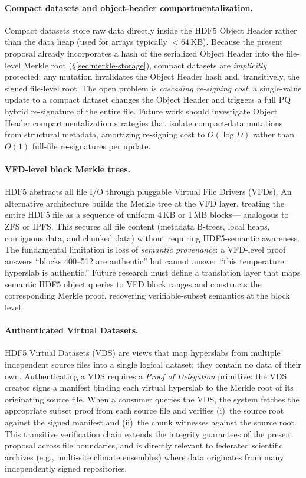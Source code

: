 \documentclass[11pt]{article}
\begin{document}
\paragraph{Compact datasets and object-header compartmentalization.}
Compact datasets store raw data directly inside the HDF5 Object Header rather
than the data heap (used for arrays typically $<$64\,KB). Because the present
proposal already incorporates a hash of the serialized Object Header into the
file-level Merkle root (\S\ref{sec:merkle-storage}), compact datasets are
\emph{implicitly} protected: any mutation invalidates the Object Header hash
and, transitively, the signed file-level root. The open problem is
\emph{cascading re-signing cost}: a single-value update to a compact dataset
changes the Object Header and triggers a full PQ hybrid re-signature of the
entire file. Future work should investigate Object Header compartmentalization
strategies that isolate compact-data mutations from structural metadata,
amortizing re-signing cost to $O(\log D)$ rather than $O(1)$ full-file
re-signatures per update.

\paragraph{VFD-level block Merkle trees.}
HDF5 abstracts all file I/O through pluggable Virtual File Drivers (VFDs).
An alternative architecture builds the Merkle tree at the VFD layer, treating
the entire HDF5 file as a sequence of uniform 4\,KB or 1\,MB blocks---
analogous to ZFS or IPFS. This secures all file content (metadata B-trees,
local heaps, contiguous data, and chunked data) without requiring HDF5-semantic
awareness. The fundamental limitation is loss of \emph{semantic provenance}: a
VFD-level proof answers ``blocks 400--512 are authentic'' but cannot answer
``this temperature hyperslab is authentic.'' Future research must define a
translation layer that maps semantic HDF5 object queries to VFD block ranges and
constructs the corresponding Merkle proof, recovering verifiable-subset
semantics at the block level.

\paragraph{Authenticated Virtual Datasets.}
HDF5 Virtual Datasets (VDS) are views that map hyperslabs from multiple
independent source files into a single logical dataset; they contain no data
of their own. Authenticating a VDS requires a \emph{Proof of Delegation}
primitive: the VDS creator signs a manifest binding each virtual hyperslab to
the Merkle root of its originating source file. When a consumer queries the VDS,
the system fetches the appropriate subset proof from each source file and
verifies (i)~the source root against the signed manifest and (ii)~the chunk
witnesses against the source root. This transitive verification chain extends
the integrity guarantees of the present proposal across file boundaries, and
is directly relevant to federated scientific archives (e.g., multi-site climate
ensembles) where data originates from many independently signed repositories.
\end{document}
